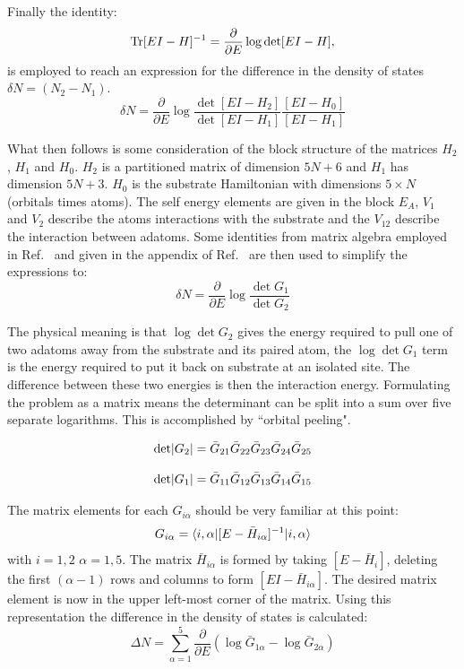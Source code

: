 Finally the identity: 
%
\begin{equation}
{\rm Tr}[EI-H]^{-1} = \frac{\partial}{\partial E} \log \det[EI-H],
\end{equation}
%
is employed to reach an expression for the difference in the density
of states $\delta N=(N_{2}-N_{1})$.
%
\begin{equation}
\delta N = \frac{\partial}{\partial E}\log\frac{\det[EI-H_{2}]}{\det [EI-H_{1}]}\frac{[EI-H_{0}]}{[EI-H_{1}]}
\end{equation}
%

What then follows is some consideration of the block structure of the matrices 
$H_2$, $H_1$ and $H_0$. $H_2$ is a partitioned matrix of dimension 
$5N+6$ and $H_1$ has dimension $5N+3$. $H_{0}$ is the substrate Hamiltonian 
with dimensions $5\times N$ (orbitals times atoms).
The self energy elements are given in the block $E_A$, $V_{1}$ and $V_{2}$ describe
the atoms interactions with the substrate and the $V_{12}$ describe the interaction
between adatoms. Some identities from matrix algebra employed in Ref.~\cite{einstein73}
and given in the appendix of Ref.~\cite{burke76} are then used to simplify the
expressions to:
%
\begin{equation}
\delta N = \frac{\partial}{\partial E}\log \frac{\det G_{1}}{\det G_{2}}
\end{equation}
%

The physical meaning is that $\log \det G_{2}$ gives the energy required to pull
one of two adatoms away from the substrate and its paired atom, the $\log \det G_1$
term is the energy required to put it back on substrate at an isolated site. 
The difference between these two energies is then the interaction energy. 
Formulating the problem as a matrix means the determinant can be split 
into a sum over five separate logarithms. This is accomplished by ``orbital peeling".

\begin{equation}
{\rm det}|G_{2}| = \bar{G}_{21}\bar{G}_{22}\bar{G}_{23}\bar{G}_{24}\bar{G}_{25}
\end{equation}

\begin{equation}
{\rm det}|G_{1}| = \bar{G}_{11}\bar{G}_{12}\bar{G}_{13}\bar{G}_{14}\bar{G}_{15}
\end{equation}

The matrix elements for each $G_{i\alpha}$ should be very familiar at this point:
%
\begin{equation}
G_{i\alpha}=\langle i,\alpha| [E-\bar{H}_{i\alpha}]^{-1} |i, \alpha\rangle
\end{equation}
%
with $i=1,2$ $\alpha=1,5$. The matrix $\bar{H}_{i\alpha}$ is formed by taking 
$[E-\bar{H}_{i}]$, deleting the first $(\alpha-1)$ rows and columns 
to form $[EI-\bar{H}_{i\alpha}]$. The desired matrix element is now 
in the upper left-most corner of the matrix. 
Using this representation the difference in the density of states is calculated:
%
\begin{equation}
\Delta N = \sum_{\alpha=1}^{5} \frac{\partial}{\partial E}(\log\bar{G}_{1\alpha} - \log \bar{G}_{2\alpha})
\end{equation}
%

